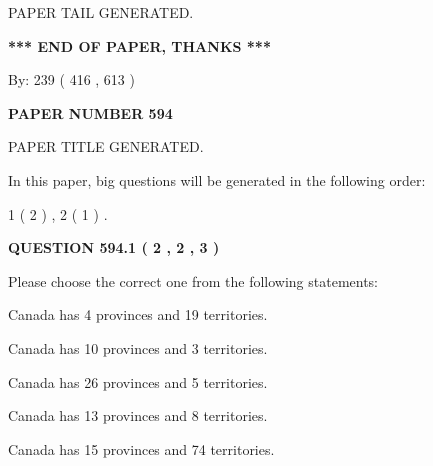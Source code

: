 \documentclass[12pt]{article}
\begin{document}
   
   
\vspace{2.0in} PAPER TAIL GENERATED.
   
   
   
   
\vspace{1.0in} 
{\textbf{\large{ *** END OF PAPER, THANKS *** }}} 
   
   
\hspace{1.0in} By: 
 239 ( 416 ,  613 )
   
   
   
   
\newpage 
\setcounter{page}{ 
   594001 } 
   
   
   
   
 {\textbf{ \Large{ PAPER NUMBER  594  }}}
   
   
\vspace{0.2in}
   
   
   
   
   
   
   
   
 \vspace{0.2in}
 
 
 
 
   
   
 PAPER TITLE GENERATED.
   
   
   
\vspace{0.2in}
   
In this paper, big questions will be generated in the following order: 
   
   
   1 ( 2 )
 ,
   2 ( 1 )
 .
  
\vspace{0.2in}
  
{\textbf{\Large{QUESTION
594.1 
 ( 2 , 2 , 3 )
}}}
  
  
Please choose the correct one from the following statements:
 
 
Canada has   4 provinces and  19 territories.
 
 
Canada has 10  provinces and 3 territories.
 
 
Canada has  26 provinces and  5 territories.
 
 
Canada has  13 provinces and  8 territories.
 
 
Canada has  15 provinces and  74 territories.
 
\end{document}
